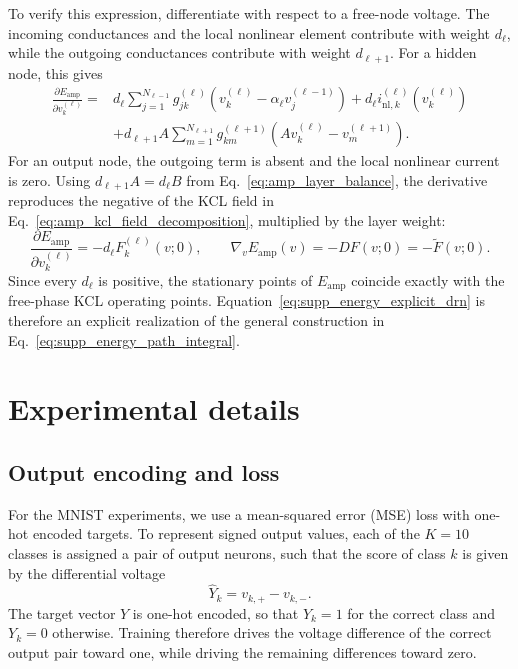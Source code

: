 \documentclass{article}
\begin{document}
To verify this expression, differentiate with respect to a free-node
voltage. The incoming conductances and the local nonlinear element
contribute with weight $d_\ell$, while the outgoing conductances contribute
with weight $d_{\ell+1}$. For a hidden node, this gives
\begin{equation}
\begin{aligned}
\frac{\partial E_{\mathrm{amp}}}{\partial v_k^{(\ell)}}
={}&d_\ell\sum_{j=1}^{N_{\ell-1}}g_{jk}^{(\ell)}
\left(v_k^{(\ell)}-\alpha_\ell v_j^{(\ell-1)}\right)
+d_\ell i_{\mathrm{nl},k}^{(\ell)}\!\left(v_k^{(\ell)}\right)
\\
&+d_{\ell+1}A\sum_{m=1}^{N_{\ell+1}}g_{km}^{(\ell+1)}
\left(A v_k^{(\ell)}-v_m^{(\ell+1)}\right).
\end{aligned}
\label{eq:supp_energy_node_derivative}
\end{equation}
For an output node, the outgoing term is absent and the local nonlinear
current is zero. Using $d_{\ell+1}A=d_\ell B$ from
Eq.~\eqref{eq:amp_layer_balance}, the derivative reproduces the negative
of the KCL field in Eq.~\eqref{eq:amp_kcl_field_decomposition}, multiplied
by the layer weight:
\begin{equation}
\frac{\partial E_{\mathrm{amp}}}{\partial v_k^{(\ell)}}
=-d_\ell F_k^{(\ell)}(v;0),
\qquad
\nabla_vE_{\mathrm{amp}}(v)=-D F(v;0)=-\widetilde F(v;0).
\label{eq:supp_energy_drn_gradient}
\end{equation}
Since every $d_\ell$ is positive, the stationary points of
$E_{\mathrm{amp}}$ coincide exactly with the free-phase KCL operating
points. Equation~\eqref{eq:supp_energy_explicit_drn} is therefore an
explicit realization of the general construction in
Eq.~\eqref{eq:supp_energy_path_integral}.



\section{Experimental details}
\label{sec:supp_experimental_details}

\subsection{Output encoding and loss}
\label{sec:supp_output_encoding}

For the MNIST experiments, we use a mean-squared error (MSE) loss with
one-hot encoded targets. To represent signed output values, each of the
$K=10$ classes is assigned a pair of output neurons, such that the score of
class $k$ is given by the differential voltage
\begin{equation}
    \hat{Y}_k = v_{k,+}-v_{k,-}.
\end{equation}
The target vector $Y$ is one-hot encoded, so that $Y_k=1$ for the correct
class and $Y_k=0$ otherwise. Training therefore drives the voltage difference
of the correct output pair toward one, while driving the remaining
differences toward zero.
\end{document}
